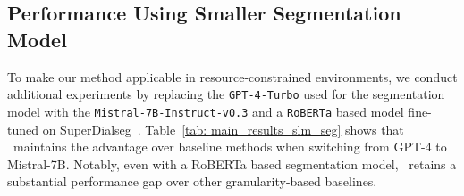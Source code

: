 

\subsection{Performance Using Smaller Segmentation Model}

To make our method applicable in resource-constrained environments, we conduct additional experiments by replacing the \texttt{GPT-4-Turbo} used for the segmentation model with the \texttt{Mistral-7B-Instruct-v0.3} and a \texttt{RoBERTa} based model fine-tuned on SuperDialseg~\citep{jiang2023superdialseg}. Table~\ref{tab: main_results_slm_seg} shows that \sysname\ maintains the advantage over baseline methods when switching from GPT-4 to Mistral-7B. Notably, even with a RoBERTa based segmentation model, \sysname\ retains a substantial performance gap over other granularity-based baselines.



% 